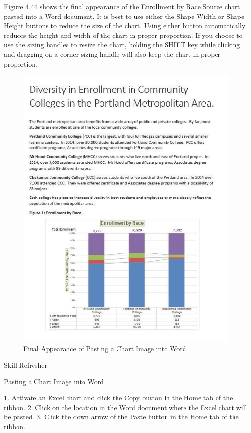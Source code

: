 Figure 4.44 shows the final appearance of the Enrollment by Race Source chart pasted into a Word
document. It is best to use either the Shape Width or Shape Height buttons to reduce the size of
the chart. Using either button automatically reduces the height and width of the chart in proper
proportion. If you choose to use the sizing handles to resize the chart, holding the SHIFT key while
clicking and dragging on a corner sizing handle will also keep the chart in proper proportion.


\begin{figure}[H]
	\centering
	\includegraphics[width=\maxwidth{.95\linewidth}]{gfx/ch04_fig47}
	\caption{Final Appearance of Pasting a Chart Image into Word}
	\label{04:fig47}
\end{figure}


Skill Refresher


Pasting a Chart Image into Word

1. Activate an Excel chart and click the Copy button in the Home tab of the ribbon.
2. Click on the location in the Word document where the Excel chart will be pasted.
3. Click the down arrow of the Paste button in the Home tab of the ribbon.




